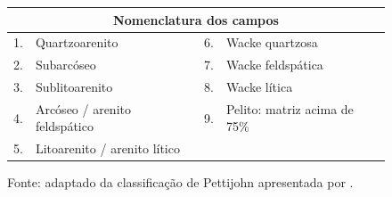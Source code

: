 \begin{figure}[H]
  \vspace{0.5em}
  \begin{tabularx}{0.98\linewidth}{@{}rX rX@{}}
    \toprule
    \multicolumn{4}{c}{\textbf{Nomenclatura dos campos}} \\
    \midrule
    1. & Quartzoarenito
       & 6. & Wacke quartzosa \\
    2. & Subarcóseo
       & 7. & Wacke feldspática \\
    3. & Sublitoarenito
       & 8. & Wacke lítica \\
    4. & Arcóseo / arenito feldspático
       & 9. & Pelito: matriz acima de 75\% \\
    5. & Litoarenito / arenito lítico
       & & \\
    \bottomrule
  \end{tabularx}
  \caption{Classificação prismática dos arenitos pelo teor de matriz e pela
  composição Q--F--L do arcabouço: Q = quartzo, F = feldspatos e
  L = fragmentos líticos.}
  \label{fig:classificacao-arenitos-prisma}
  \caption*{\footnotesize Fonte: adaptado da classificação de Pettijohn apresentada
  por \textcite{nichols2009}.}
\end{figure}
